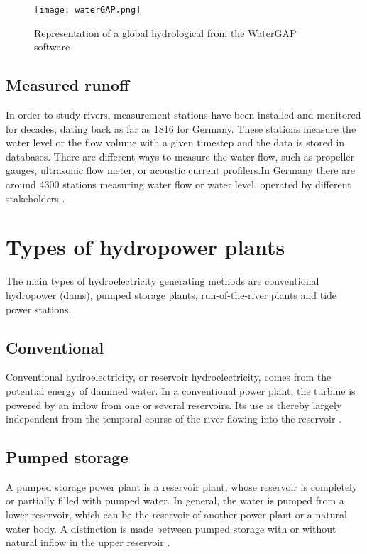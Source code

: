 \begin{figure}[H]
\texttt{[image: waterGAP.png]}
\caption[Representation of a global hydrological from the WaterGAP software]{Representation of a global hydrological from the WaterGAP software \cite{doll}}
\centering
\label{waterGAP}
\end{figure}

 
\subsection{Measured runoff}
 
In order to study rivers, measurement stations have been installed and monitored for decades, dating back as far as 1816 for Germany. These stations measure the water level or the flow volume with a given timestep and the data is stored in databases. There are different ways to measure the water flow, such as propeller gauges, ultrasonic flow meter, or acoustic current profilers.In Germany there are around 4300 stations measuring water flow or water level, operated by different stakeholders \cite{bafg_hyd}.

 
\section{Types of hydropower plants}

The main types of hydroelectricity generating methods are conventional hydropower (dams), pumped storage plants, run-of-the-river plants and tide power stations.

\subsection{Conventional}

Conventional hydroelectricity, or reservoir hydroelectricity, comes from the potential energy of dammed water. In a conventional power plant, the turbine is powered by an inflow from one or several reservoirs. Its use is thereby largely independent from the temporal course of the river flowing into the reservoir \cite{vgb}.

\subsection{Pumped storage}

A pumped storage power plant is a reservoir plant, whose reservoir is completely or partially filled with pumped water. In general, the water is pumped from a lower reservoir, which can be the reservoir of another power plant or a natural water body. A distinction is made between pumped storage with or without natural inflow in the upper reservoir \cite{vgb}.

